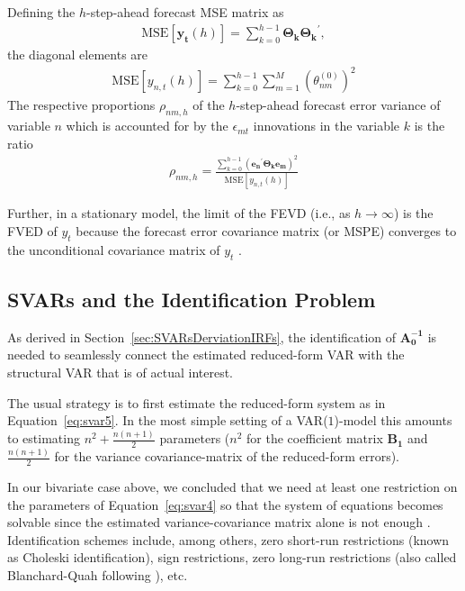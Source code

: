 \documentclass[a4paper,11pt,listof=nochaptergap,oneside,pointednumbers,bibtotoc,bigheadings,liststotoc,hidelinks]{scrbook}
\theoremstyle{mysatz}
\theoremstyle{mydefinition}
\theoremstyle{mytheorem}
\theoremstyle{mybemerkung}
\newcommand{\vect}[1]{\boldsymbol{\mathbf{#1}}}
\begin{document}
Defining the $h$-step-ahead forecast MSE matrix as
\begin{equation} \label{eq:FVED4}
\begin{split}
 		\text{MSE}[\vect{y_t}(h)] = \sum\limits_{k=0}^{h-1} \vect{\Theta_k}\vect{\Theta_k}^',
\end{split}								
\end{equation}
the diagonal elements are
\begin{equation} \label{eq:FVED5}
\begin{split}
 		\text{MSE}[y_{n,t}(h)] = \sum\limits_{k=0}^{h-1}\sum\limits_{m=1}^{M}\left(\theta_{nm}^{(0)}\right)^2
\end{split}								
\end{equation}
The respective proportions $\rho_{nm,h}$ of the $h$-step-ahead forecast error variance of variable $n$ which is accounted for by the $\epsilon_{mt}$ innovations in the variable $k$ is the ratio
\begin{equation} \label{eq:FVED6}
\begin{split}
 		\rho_{nm,h} = \frac{\sum\limits_{k=0}^{h-1} (\vect{e_n}^'\vect{\Theta_k}\vect{e_m})^2}{\text{MSE}[y_{n,t}(h)]}
\end{split}								
\end{equation}

Further, in a stationary model, the limit of the FEVD (i.e., as $h \rightarrow \infty$) is the FVED of $y_t$ because the forecast error covariance matrix (or MSPE) converges to the unconditional covariance matrix of $y_t$ \citep{lutkepohlkilian:17}. 


\subsection{SVARs and the Identification Problem}
\label{sec:strcuturalVARsIdentification}
As derived in Section~\ref{sec:SVARsDerviationIRFs}, the identification of $\vect{A_0^{-1}}$ is needed to seamlessly connect the estimated reduced-form VAR with the structural VAR that is of actual interest.

The usual strategy is to first estimate the reduced-form system as in Equation~\ref{eq:svar5}. In the most simple setting of a VAR($1$)-model this amounts to estimating $n^2 + \frac{n(n+1)}{2}$ parameters ($n^2$ for the coefficient matrix $\vect{B_1}$ and $\frac{n(n+1)}{2}$ for the variance covariance-matrix of the reduced-form errors). 

In our bivariate case above, we concluded that we need at least one restriction on the parameters of Equation~\ref{eq:svar4} so that the system of equations becomes solvable since the estimated variance-covariance matrix alone is not enough \citep{ludvigsonetal:20a}. Identification schemes include, among others, zero short-run restrictions (known as Choleski identification), sign restrictions, zero long-run restrictions (also called Blanchard-Quah following \citealp{blanchardandquah:89}), etc.
\end{document}
